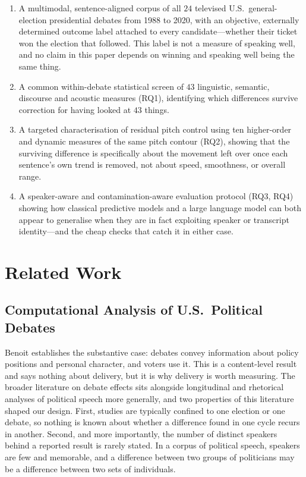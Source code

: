 \documentclass[journal]{IEEEtran}
\begin{document}
\begin{enumerate}\itemsep3pt
  \item A multimodal, sentence-aligned corpus of all $24$ televised U.S.\
        general-election presidential debates from 1988 to 2020, with an
        objective, externally determined outcome label attached to every
        candidate---whether their ticket won the election that followed. This
        label is not a measure of speaking well, and no claim in this paper
        depends on winning and speaking well being the same thing.
  \item A common within-debate statistical screen of $43$ linguistic,
        semantic, discourse and acoustic measures (RQ1), identifying which
        differences survive correction for having looked at $43$ things.
  \item A targeted characterisation of residual pitch control using ten
        higher-order and dynamic measures of the same pitch contour (RQ2),
        showing that the surviving difference is specifically about the
        movement left over once each sentence's own trend is removed, not
        about speed, smoothness, or overall range.
  \item A speaker-aware and contamination-aware evaluation protocol (RQ3,
        RQ4) showing how classical predictive models and a large language
        model can both appear to generalise when they are in fact exploiting
        speaker or transcript identity---and the cheap checks that catch it
        in either case.
\end{enumerate}

\section{Related Work}
\label{sec:related}

\subsection{Computational Analysis of U.S.\ Political Debates}
\label{sec:related:debates}

Benoit \cite{benoit2014debates} establishes the substantive case: debates
convey information about policy positions and personal character, and voters
use it. This is a content-level result and says nothing about delivery, but it
is why delivery is worth measuring. The broader literature on debate effects
sits alongside longitudinal and rhetorical analyses of political speech more
generally, and two properties of this literature shaped our design. First,
studies are typically confined to one election or one debate, so nothing is
known about whether a difference found in one cycle recurs in another.
Second, and more importantly, the number of distinct speakers behind a
reported result is rarely stated. In a corpus of political speech, speakers
are few and memorable, and a difference between two groups of politicians may
be a difference between two sets of individuals.
\end{document}
